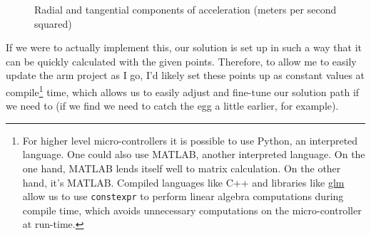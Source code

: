 \documentclass[nofoot,pdf-a,balance,colorlinks,upint,subscriptcorrection,varvw,mathalfa=cal=boondoxo]{asmeconf}
\begin{document}
        \begin{figure}[H]
            \centering

            \caption{Radial and tangential components of acceleration (meters per second squared)}\label{actuatorAccel2D}
        \end{figure}


        If we were to actually implement this, our solution is set up in such a way that it can be quickly calculated with the given points. Therefore, to allow me to easily update the arm project as I go, I'd likely set these points up as constant values at compile\footnote{For higher level micro-controllers it is possible to use Python, an interpreted language. One could also use MATLAB, another interpreted language. On the one hand, MATLAB lends itself well to matrix calculation. On the other hand, it's MATLAB. Compiled languages like C++ and libraries like \href{https://github.com/g-truc/glm}{glm} allow us to use \texttt{constexpr} to perform linear algebra computations during compile time, which avoids unnecessary computations on the micro-controller at run-time.} time, which allows us to easily adjust and fine-tune our solution path if we need to (if we find we need to catch the egg a little earlier, for example).

	
\end{document}
